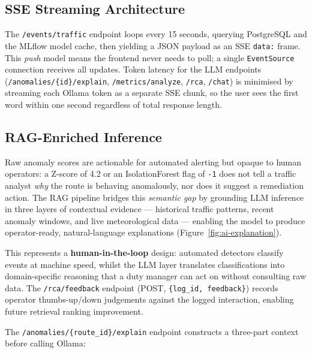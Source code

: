 \subsection{SSE Streaming Architecture}

The \texttt{/events/traffic} endpoint loops every 15 seconds, querying
PostgreSQL and the MLflow model cache, then yielding a JSON payload as an SSE
\texttt{data:} frame. This \textit{push} model means the frontend never needs
to poll; a single \texttt{EventSource} connection receives all updates. Token
latency for the LLM endpoints (\texttt{/anomalies/\{id\}/explain},
\texttt{/metrics/analyze}, \texttt{/rca}, \texttt{/chat}) is minimised by
streaming each Ollama token as a separate SSE chunk, so the user sees the
first word within one second regardless of total response length.

\subsection{RAG-Enriched Inference}

Raw anomaly scores are actionable for automated alerting but opaque to
human operators: a Z-score of 4.2 or an IsolationForest flag of
\texttt{-1} does not tell a traffic analyst \textit{why} the route is
behaving anomalously, nor does it suggest a remediation action. The RAG
pipeline bridges this \textit{semantic gap} by grounding LLM inference in
three layers of contextual evidence --- historical traffic patterns,
recent anomaly windows, and live meteorological data --- enabling the
model to produce operator-ready, natural-language explanations
(Figure~\ref{fig:ai-explanation}).

This represents a \textbf{human-in-the-loop} design: automated detectors
classify events at machine speed, whilst the LLM layer translates
classifications into domain-specific reasoning that a duty manager can act
on without consulting raw data. The \texttt{/rca/feedback} endpoint
(POST, \texttt{\{log\_id, feedback\}}) records operator thumbs-up/down
judgements against the logged interaction, enabling future retrieval
ranking improvement.

The \texttt{/anomalies/\{route\_id\}/explain} endpoint constructs a
three-part context before calling Ollama:

